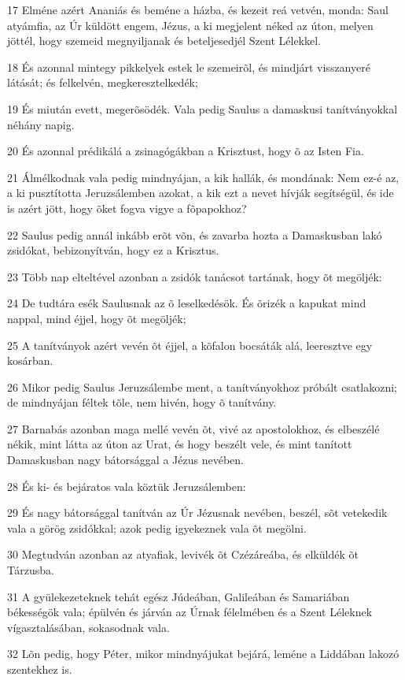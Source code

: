 \par 17 Elméne azért Ananiás és beméne a házba, és kezeit reá vetvén, monda: Saul atyámfia, az Úr küldött engem, Jézus, a ki megjelent néked az úton, melyen jöttél, hogy szemeid megnyiljanak és beteljesedjél Szent Lélekkel.
\par 18 És azonnal mintegy pikkelyek estek le szemeirõl, és mindjárt visszanyeré látását; és felkelvén, megkeresztelkedék;
\par 19 És miután evett, megerõsödék. Vala pedig Saulus a damaskusi tanítványokkal néhány napig.
\par 20 És azonnal prédikálá a zsinagógákban a Krisztust, hogy õ az Isten Fia.
\par 21 Álmélkodnak vala pedig mindnyájan, a kik hallák, és mondának: Nem ez-é az, a ki pusztította Jeruzsálemben azokat, a kik ezt a nevet hívják segítségül, és ide is azért jött, hogy õket fogva vigye a fõpapokhoz?
\par 22 Saulus pedig annál inkább erõt võn, és zavarba hozta a Damaskusban lakó zsidókat, bebizonyítván, hogy ez a Krisztus.
\par 23 Több nap elteltével azonban a zsidók tanácsot tartának, hogy õt megöljék:
\par 24 De tudtára esék Saulusnak az õ leselkedésök. És õrizék a kapukat mind nappal, mind éjjel, hogy õt megöljék;
\par 25 A tanítványok azért vevén õt éjjel, a kõfalon bocsáták alá, leeresztve egy kosárban.
\par 26 Mikor pedig Saulus Jeruzsálembe ment, a tanítványokhoz próbált csatlakozni; de mindnyájan féltek tõle, nem hivén, hogy õ tanítvány.
\par 27 Barnabás azonban maga mellé vevén õt, vivé az apostolokhoz, és elbeszélé nékik, mint látta az úton az Urat, és hogy beszélt vele, és mint tanított Damaskusban nagy bátorsággal a Jézus nevében.
\par 28 És ki- és bejáratos vala köztük Jeruzsálemben:
\par 29 És nagy bátorsággal tanítván az Úr Jézusnak nevében, beszél, sõt vetekedik vala a görög zsidókkal; azok pedig igyekeznek vala õt megölni.
\par 30 Megtudván azonban az atyafiak, levivék õt Czézáreába, és elküldék õt Tárzusba.
\par 31 A gyülekezeteknek tehát egész Júdeában, Galileában és Samariában békességök vala; épülvén és járván az Úrnak félelmében és a Szent Léleknek vígasztalásában, sokasodnak vala.
\par 32 Lõn pedig, hogy Péter, mikor mindnyájukat bejárá, leméne a Liddában lakozó szentekhez is.

